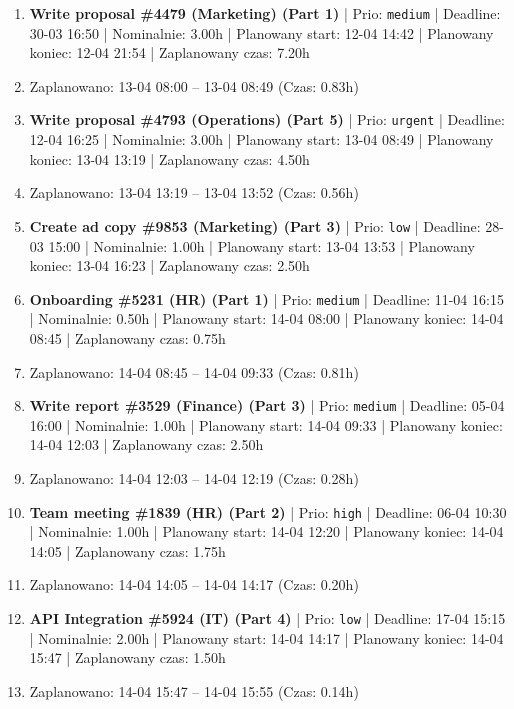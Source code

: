 {\begin{enumerate}
  \item [\textbf{14660}] \textbf{Write proposal \#4479 (Marketing) (Part 1)} | Prio: \texttt{medium} | Deadline: 30-03 16:50 | Nominalnie: 3.00h | Planowany start: 12-04 14:42 | Planowany koniec: 12-04 21:54 | Zaplanowany czas: 7.20h
  \item [\textbf{PRZERWA}] Zaplanowano: 13-04 08:00 -- 13-04 08:49 (Czas: 0.83h)
  \item [\textbf{14600}] \textbf{Write proposal \#4793 (Operations) (Part 5)} | Prio: \texttt{urgent} | Deadline: 12-04 16:25 | Nominalnie: 3.00h | Planowany start: 13-04 08:49 | Planowany koniec: 13-04 13:19 | Zaplanowany czas: 4.50h
  \item [\textbf{PRZERWA}] Zaplanowano: 13-04 13:19 -- 13-04 13:52 (Czas: 0.56h)
  \item [\textbf{14679}] \textbf{Create ad copy \#9853 (Marketing) (Part 3)} | Prio: \texttt{low} | Deadline: 28-03 15:00 | Nominalnie: 1.00h | Planowany start: 13-04 13:53 | Planowany koniec: 13-04 16:23 | Zaplanowany czas: 2.50h
  \item [\textbf{14671}] \textbf{Onboarding \#5231 (HR) (Part 1)} | Prio: \texttt{medium} | Deadline: 11-04 16:15 | Nominalnie: 0.50h | Planowany start: 14-04 08:00 | Planowany koniec: 14-04 08:45 | Zaplanowany czas: 0.75h
  \item [\textbf{PRZERWA}] Zaplanowano: 14-04 08:45 -- 14-04 09:33 (Czas: 0.81h)
  \item [\textbf{14672}] \textbf{Write report \#3529 (Finance) (Part 3)} | Prio: \texttt{medium} | Deadline: 05-04 16:00 | Nominalnie: 1.00h | Planowany start: 14-04 09:33 | Planowany koniec: 14-04 12:03 | Zaplanowany czas: 2.50h
  \item [\textbf{PRZERWA}] Zaplanowano: 14-04 12:03 -- 14-04 12:19 (Czas: 0.28h)
  \item [\textbf{14610}] \textbf{Team meeting \#1839 (HR) (Part 2)} | Prio: \texttt{high} | Deadline: 06-04 10:30 | Nominalnie: 1.00h | Planowany start: 14-04 12:20 | Planowany koniec: 14-04 14:05 | Zaplanowany czas: 1.75h
  \item [\textbf{PRZERWA}] Zaplanowano: 14-04 14:05 -- 14-04 14:17 (Czas: 0.20h)
  \item [\textbf{14696}] \textbf{API Integration \#5924 (IT) (Part 4)} | Prio: \texttt{low} | Deadline: 17-04 15:15 | Nominalnie: 2.00h | Planowany start: 14-04 14:17 | Planowany koniec: 14-04 15:47 | Zaplanowany czas: 1.50h
  \item [\textbf{PRZERWA}] Zaplanowano: 14-04 15:47 -- 14-04 15:55 (Czas: 0.14h)

\end{enumerate}}
